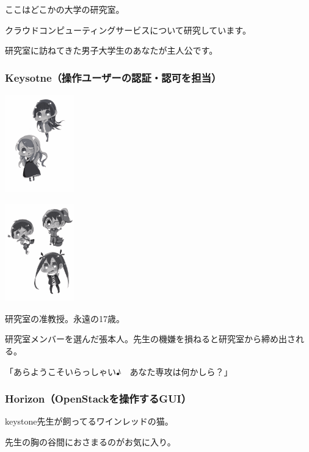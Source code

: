 \documentclass[9pt,b5paper,tombo,openany,dvipdfmx]{jsbook}
\begin{document}
\begin{minipage}{1.1\textwidth}
	\small
	ここはどこかの大学の研究室。

	クラウドコンピューティングサービスについて研究しています。

	研究室に訪ねてきた男子大学生のあなたが主人公です。

	\subsubsection{Keysotne（操作ユーザーの認証・認可を担当）}

	\begin{floatingfigure}[r]{3cm}
		\includegraphics[width=3cm]{./img/char1.pdf}
	\end{floatingfigure}

	\begin{floatingfigure}[r]{3cm}
		\includegraphics[width=3cm]{./img/char2.pdf}
	\end{floatingfigure}

	研究室の准教授。永遠の17歳。

	研究室メンバーを選んだ張本人。先生の機嫌を損ねると研究室から締め出される。

	「あらようこそいらっしゃい♪　あなた専攻は何かしら？」

	\subsubsection{Horizon（OpenStackを操作するGUI）}

	keystone先生が飼ってるワインレッドの猫。

	先生の胸の谷間におさまるのがお気に入り。


\end{minipage}
\end{document}
